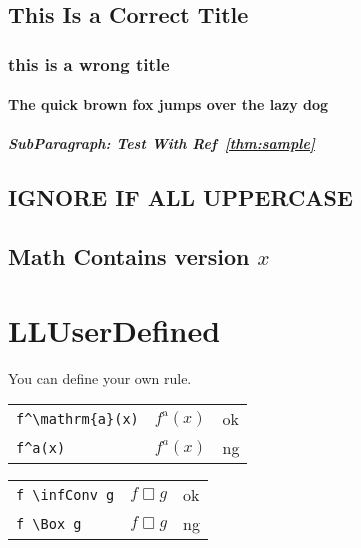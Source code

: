 \documentclass[a4paper]{article}
\newcommand{\tA}[1]{\textcolor{cA}{#1}}
\newcommand{\tD}[1]{\textcolor{cD}{#1}}
\DeclareMathOperator{\infConv}{\Box}
\begin{document}
\subsection{
	This Is a Correct Title
}

\subsubsection{this is a wrong title}

\paragraph{The quick brown fox jumps over the lazy dog}

\subparagraph{SubParagraph: Test With Ref~\ref{thm:sample}}

\subsection{IGNORE IF ALL UPPERCASE}

\subsection{Math Contains version $x$}

\section{LLUserDefined}

You can define your own rule.

\begin{table}[H]
	\centering
	\begin{tabular}{lll}
		\verb|f^\mathrm{a}(x)| & $f^{\mathrm{a}}(x)$ & \tA{ok} \\
		\verb|f^a(x)|          & $f^a(x)$            & \tD{ng} \\
	\end{tabular}
\end{table}

\begin{table}[H]
	\centering
	\begin{tabular}{lll}
		\verb|f \infConv g| & $f \infConv g$ & \tA{ok} \\
		\verb|f \Box g|     & $f \Box g$     & \tD{ng} \\
	\end{tabular}
\end{table}

\newpage
\appendix
\end{document}
